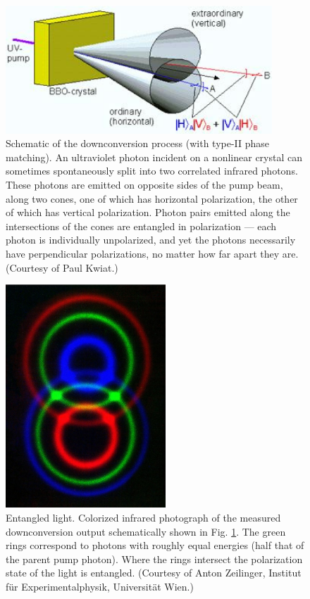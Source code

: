 \documentclass[12pt,amsmath,amssymb]{article}
\numberwithin{equation}{section}
\begin{document}
\begin{figure}
\begin{center}
\includegraphics[width=10cm]{fig4.eps}
\end{center}
\caption{\label{fig:double}
Schematic of the downconversion process
(with type-II phase matching).
An ultraviolet photon incident on a nonlinear crystal
can sometimes spontaneously split into
two correlated infrared photons.
These photons are emitted on opposite sides of the pump beam,
along two cones,
one of which has horizontal polarization,
the other of which has vertical polarization.
Photon pairs emitted along the intersections
of the cones are entangled in polarization ---
each photon is individually unpolarized,
and yet the photons necessarily have
perpendicular polarizations,
no matter how far apart they are.
(Courtesy of Paul Kwiat.)}
\end{figure}
\begin{figure}
\begin{center}
\includegraphics[width=6cm]{fig5.eps}
\end{center}
\caption{\label{fig:cones}Entangled light. Colorized infrared
photograph of the measured downconversion output \cite{Kwiat1}
schematically shown in Fig. \ref{fig:double}. The green rings
correspond to photons with roughly equal energies (half that of
the parent pump photon). Where the rings intersect the
polarization state of the light is entangled. (Courtesy of Anton
Zeilinger, Institut f\"ur Experimentalphysik, Universit\"at Wien.)}
\end{figure}
\end{document}
